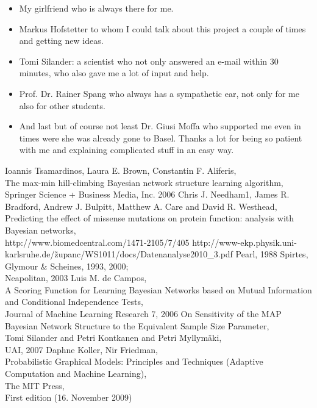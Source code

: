 	\begin{itemize}
		\item My girlfriend who is always there for me.
		\item Markus Hofstetter to whom I could talk about this project a couple of times and getting new ideas.
		\item Tomi Silander: a scientist who not only answered an e-mail within 30 minutes, who also gave me a lot of input and help.
		\item Prof. Dr. Rainer Spang who always has a sympathetic ear, not only for me also for other students.
		\item And last but of course not least Dr. Giusi Moffa who supported me even in times were she was already gone to Basel. Thanks a lot for being so patient with me and explaining complicated stuff in an easy way.
	\end{itemize}

\begin{thebibliography}{56}

Ioannis Tsamardinos, Laura E. Brown, Constantin F. Aliferis,\\
The max-min hill-climbing Bayesian network structure learning algorithm,\\
Springer Science + Business Media,
Inc. 2006
Chris J. Needham1, James R. Bradford, Andrew J. Bulpitt, Matthew A. Care and David R. Westhead,\\
Predicting the effect of missense mutations on protein function: analysis with Bayesian networks,\\
http://www.biomedcentral.com/1471-2105/7/405
http://www-ekp.physik.uni-karlsruhe.de/\~zupanc/WS1011/docs/Datenanalyse2010\_3.pdf
Pearl,
1988
Spirtes, Glymour \& Scheines,
1993, 2000; \\
Neapolitan,
2003
Luis M. de Campos,\\
A Scoring Function for Learning Bayesian Networks based on Mutual
Information and Conditional Independence Tests,\\
Journal of Machine Learning Research 7, 2006
On Sensitivity of the MAP Bayesian Network Structure to the Equivalent Sample Size Parameter,\\
Tomi Silander and Petri Kontkanen and Petri Myllymäki,\\
UAI, 2007
Daphne Koller, Nir Friedman,\\
Probabilistic Graphical Models: Principles and Techniques (Adaptive Computation and Machine Learning),\\
The MIT Press,\\
First edition (16. November 2009)

\end{thebibliography}




			
			
			
			
			
			
			
			
			
			
			
			
			
			
			
			
			



			
			
			
			